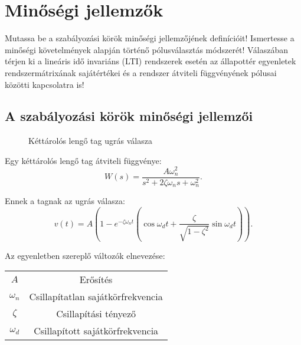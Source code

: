\section{Minőségi jellemzők}

\begin{about}
  Mutassa be a szabályozási körök minőségi jellemzőjének definícióit! Ismertesse
  a minőségi követelmények alapján történő pólusválasztás módszerét! Válaszában
  térjen ki a lineáris idő invariáns (LTI) rendszerek esetén az állapottér
  egyenletek rendszermátrixának sajátértékei és a rendszer átviteli függvényének
  pólusai közötti kapcsolatra is!
\end{about}

\subsection{A szabályozási körök minőségi jellemzői}

\begin{figure}[htb]
  \centering
  
  \caption{Kéttárolós lengő tag ugrás válasza}
  \label{fig:step}
\end{figure}

Egy kéttárolós lengő tag átviteli függvénye:
\begin{equation}
  W(s) = \frac{A \omega_n^2}{s^2 + 2 \zeta \omega_n s + \omega_n^2}
  .
  \label{eq:W-2-ref}
\end{equation}

Ennek a tagnak az ugrás válasza:
\begin{equation}
  v(t) = A \left(
  1 - e^{-\zeta \omega_n t} \left(
  \cos \omega_d t
  + \frac{\zeta}{\sqrt{1 - \zeta^2}} \sin \omega_d t
  \right)
  \right)
  .
  \label{eq:W-2-ref-step}
\end{equation}

Az egyenletben szereplő változók elnevezése:
\begin{center}
  \begin{tabular}{ | c c | }
    \hline
    $A$        & {Erősítés}                          \\
    $\omega_n$ & {Csillapítatlan sajátkörfrekvencia} \\
    $\zeta$    & {Csillapítási tényező}              \\
    $\omega_d$ & {Csillapított sajátkörfrekvencia}   \\
    \hline
  \end{tabular}
\end{center}

